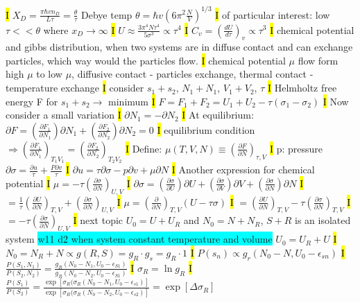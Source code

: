 \documentclass[fontsize=4pt]{scrartcl}
\begin{document}
\hl{I}
$X_D = \frac{\pi \hbar v n_D}{L \tau} = \frac{\theta}{\tau}$ Debye temp $\theta = \hbar v (6\pi^2 \frac{N}{V})^{1/3}$
\hl{I} 
of particular interest: low 
$\tau << \theta $ where $ x_D \rightarrow \infty$
\hl{I}
$U \approx \frac{3\pi^4 N \tau^4}{5 \sigma^3} \propto \tau^4$
\hl{I}
$C_v = (\frac{dU}{d\tau})_v \propto \tau^3$
\hl{I}
chemical potential and gibbs distribution, when two systems are in diffuse contact and can exchange particles, which way would the particles flow. 
\hl{I}
chemical potential $\mu$ flow form high $\mu$ to low $\mu$, diffusive contact - particles exchange, thermal contact - temperature exchange
\hl{I}
consider $s_1 + s_2$, $N_1 + N_1$, $V_1 + V_2$, $\tau$
\hl{I}
Helmholtz free energy F for $s_1 + s_2 \rightarrow$ minimum
\hl{I}
$F=F_1 + F_2 = U_1 + U_2 - \tau(\sigma_1 - \sigma_2)$
\hl{I}
Now consider a small variation
\hl{I}
$\partial N_1 =- \partial N_2$
\hl{I}
At equilibrium: $\partial F = (\frac{\partial F_1}{\partial N_1}) \partial N_1 + (\frac{\partial F_2}{\partial N_2})\partial N_2 = 0$
\hl{I}
equilibrium condition$ \Rightarrow (\frac{\partial F_1}{\partial N_1})_{T_1 V_1} = (\frac{\partial F_2}{\partial N_2})_{T_2 V_2} $
\hl{I}
Define: $\mu(T,V,N) \equiv (\frac{\partial F}{\partial N})_{\tau,V}$
\hl{I}
p: pressure $\partial \sigma = \frac{\partial u}{\tau} + \frac{P \partial v}{\tau}  $
\hl{I}
$\partial u = \tau \partial \sigma - p \partial v + \mu \partial N$
\hl{I}
Another expression for chemical potential
\hl{I}
$\mu = -\tau (\frac{\partial \sigma}{\partial N})_{U,V}$
\hl{I}
$\partial \sigma = (\frac{\partial \sigma}{\partial U})\partial U + (\frac{\partial \sigma}{\partial V})\partial V + (\frac{\partial \sigma}{\partial N})\partial N$
\hl{I}
$= \frac{1}{\tau} (\frac{\partial U}{\partial N})_{T,V} + (\frac{\partial \sigma}{\partial N})_{U,V}$
\hl{I}
$\mu = (\frac{\partial}{\partial N})_{T,V} (U-\tau \sigma)$
\hl{I}
$= (\frac{\partial U}{\partial N})_{T,V} - \tau (\frac{\partial \sigma}{\partial N})_{T,V}$
\hl{I}
$= -\tau (\frac{\partial \sigma}{\partial N})_{U,V}$
\hl{I}
next topic $U_0 = U + U_R$ and $N_0 =  N + N_R$, $S+R$ is an isolated system
\colorbox{Cyan}{w11 d2 when system constant temperature and volume}
$U_0 =U_R + U$
\hl{I}
$N_0=N_R+N \propto g(R,S) = g_R \cdot g_s = g_R \cdot 1$
\hl{I}
$P(s_n) \propto g_r (N_0 - N, U_0 - \epsilon_{sn})$
\hl{I}
$\frac{P(S_1,N_1)}{P(S_2,N_2)} = \frac{g_R(N_0 - N_1, U_0 - \epsilon_{S1})} {g_R(N_0 - N_2, U_0 - \epsilon_{S1})} $
\hl{I}
$\sigma_R = \ln g_R$
\hl{I}
$\frac{P(S_1)}{P(S_2)} = \frac{\exp[\sigma_R (\sigma_R(N_0 - N_1 , U_0 - \epsilon_{s1})] } {\exp[\sigma_R (\sigma_R(N_0 - N_2 , U_0 - \epsilon_{s2})] } =  \exp[\Delta \sigma_R] $
\end{document}
